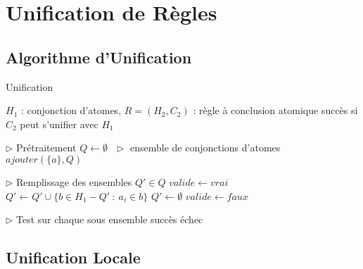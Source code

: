 \section {Unification de R\`egles}

\subsection{Algorithme d'Unification}
\begin{center}
\begin{algorithm}[H]
\caption{Unification}\label{unification}
\begin{algorithmic}[1]
\REQUIRE $H_{1}$ : conjonction d'atomes, $R = (H_{2},C_{2})$ : r\`egle \`a conclusion atomique 
\ENSURE succ\`es si $C_{2}$ peut s'unifier avec $H_{1}$ 

\STATE $\triangleright$ Pr\'etraitement
\STATE $Q \leftarrow \emptyset\ \ \ \triangleright$ ensemble de conjonctions d'atomes
		\STATE $ajouter(\{a\},Q)$
	\ENDIF
\ENDFOR

\STATE $\triangleright$ Remplissage des ensembles $Q' \in Q$
	\STATE $valide \leftarrow vrai$
				\STATE $Q' \leftarrow Q' \cup \{b \in H_{1}-Q'\ :\ a_{i} \in b\}$
			\ELSE
				\STATE $Q' \leftarrow \emptyset$
				\STATE $valide \leftarrow faux$
			\ENDIF
		\ENDFOR
	\ENDFOR
\ENDFOR

\STATE $\triangleright$ Test sur chaque sous ensemble
			\RETURN succ\`es
		\ENDIF
	\ENDIF
\ENDFOR
\RETURN \'echec

\end{algorithmic}
\end{algorithm}
\end{center}

\subsection{Unification Locale}

